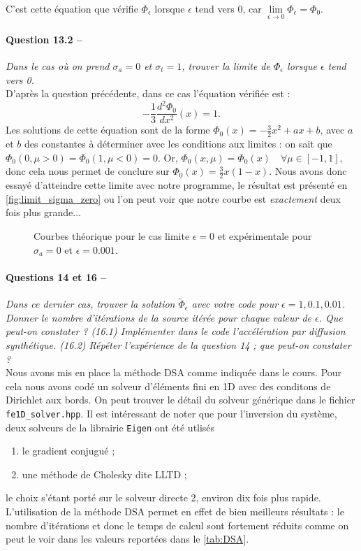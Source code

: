 \documentclass[11pt,a4paper]{article}
\newcommand{\question}[2]{\paragraph{Question #1 --}\hspace{-7pt}\textit{#2} \\}
\newcommand{\questions}[2]{\paragraph{Questions #1 --}\hspace{-7pt}\textit{#2} \\}
\newcommand{\Phit}{\widetilde{\Phi}}
\begin{document}
C'est cette équation que vérifie $\Phi_\epsilon$ lorsque $\epsilon$ tend vers 0, car $\lim\limits_{\epsilon \rightarrow 0} \Phi_\epsilon = \Phi_0$.

\question{13.2}{Dans le cas où on prend $\sigma_a = 0$ et $\sigma_t = 1$, trouver la limite de $\Phi_\epsilon$ lorsque $\epsilon$ tend vers 0.}

D'après la question précédente, dans ce cas l'équation vérifiée est :
\begin{equation}
- \frac{1}{3} \frac{d^2 \Phi_0}{d x^2}(x) = 1 .
\end{equation}
Les solutions de cette équation sont de la forme $\Phi_0(x) = -\frac{3}{2}x^2 + a x +b$, avec $a$ et $b$ des constantes à déterminer avec les conditions aux limites : on sait que $\Phi_0(0,\mu >0) = \Phi_0(1,\mu <0) = 0$.
Or, $\Phi_0(x,\mu) = \Phi_0(x) \quad \forall \mu \in [-1,1]$, donc cela nous permet de conclure sur $\Phi_0(x) = \frac{3}{2}x(1-x)$. Nous avons donc essayé d'atteindre cette limite avec notre programme, le résultat est présenté en \autoref{fig:limit_sigma_zero} ou l'on peut voir que notre courbe est \emph{exactement} deux fois plus grande...

\begin{figure}
  \centering
  
  \caption{Courbes théorique pour le cas limite $\epsilon=0$ et expérimentale pour $\sigma_a=0$ et $\epsilon=0.001$.}
  \label{fig:limit_sigma_zero}
\end{figure}

\questions{14 et 16}{Dans ce dernier cas, trouver la solution $\Phit_\epsilon$ avec votre code pour $\epsilon = 1, 0.1, 0.01$. Donner le nombre d'itérations de la source itérée pour chaque valeur de $\epsilon$. Que peut-on constater ? (16.1) Implémenter dans le code l'accélération par diffusion synthétique. (16.2) Répéter l'expérience de la question 14 ; que peut-on constater ?}

Nous avons mis en place la méthode DSA comme indiquée dans le cours. Pour cela nous avons codé un solveur d'éléments fini en 1D avec des conditons de Dirichlet aux bords. On peut trouver le détail du solveur générique dans le fichier \texttt{fe1D\_solver.hpp}. Il est intéressant de noter que pour l'inversion du système, deux solveurs de la librairie \texttt{Eigen} ont été utlisés
\begin{enumerate}
\item le gradient conjugué ;
\item une méthode de Cholesky dite LLTD ;
\end{enumerate}
le choix s'étant porté sur le solveur directe 2, environ dix fois plus rapide. L'utilisation de la méthode DSA permet en effet de bien meilleurs résultats : le nombre d'itérations et donc le temps de calcul sont fortement réduits comme on peut le voir dans les valeurs reportées dans le \autoref{tab:DSA}. 
\end{document}
